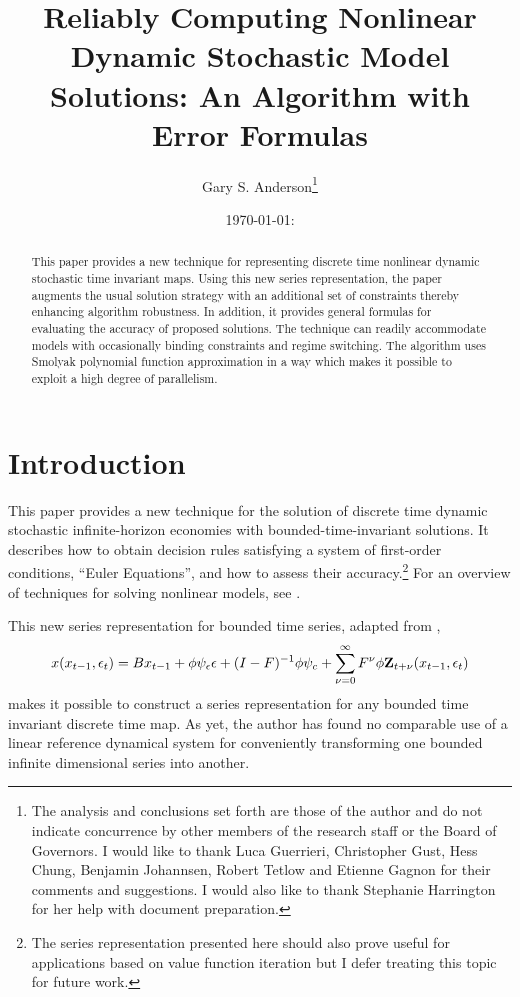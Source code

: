 \documentclass[12pt]{article}
\author{Gary S. Anderson\thanks{The analysis and conclusions set forth are those of the author and do not indicate concurrence by other members of the research staff or the Board of Governors. I would like to thank Luca Guerrieri, Christopher Gust, Hess Chung, Benjamin Johannsen, Robert Tetlow and Etienne Gagnon for their comments and suggestions.  I would also like to thank Stephanie Harrington for her help with document preparation.
}}
\title{Reliably Computing
  Nonlinear Dynamic Stochastic Model Solutions: 
An Algorithm with Error Formulas } %
\date{\today: \currenttime}
\begin{document}



\maketitle

\begin{abstract}
This paper provides a new technique for representing  discrete time  nonlinear dynamic stochastic time invariant maps.
Using this new series representation, the paper 
augments the usual solution strategy with an additional set of
constraints thereby enhancing algorithm robustness.
In addition, it provides general
formulas for evaluating the accuracy of proposed solutions.
The technique can readily accommodate models with occasionally binding constraints and regime switching. 
The  algorithm  uses
Smolyak polynomial function approximation  in a way which makes it possible to exploit a high degree of parallelism.







\end{abstract}

\newpage
\tableofcontents
\newpage

\section{Introduction}

This paper provides a new technique for
 the solution of discrete time  dynamic stochastic
infinite-horizon economies with bounded-time-invariant solutions.
It describes how to obtain decision rules satisfying a system of 
first-order conditions, ``Euler Equations'',  and how to assess their accuracy.\footnote{The series 
representation presented here should also prove useful for applications based on
value function iteration but I  defer treating this topic for
 future work.
}
 For an overview of techniques for solving nonlinear models,
see \citep{judd92,Christiano2000,doraszelskiy04,gaspar97,Judd2014,marcet.lorenzoni99,juddGSSA2011,maliarmovingbounds,RePEc:bny:wpaper:0058,JuddIntegrals}.


This new series representation for bounded time series, adapted from \citep{anderson10},
\begin{gather*}
      	 x\tArg =B x_{t-1}+ \phi \psi_\epsilon\epsilon + (I - F)^{-1} \phi \psi_c + \sum_{\sForSum=0}^\infty F^\sForSum \phi \ZWOarg_{t+\nu}\tArg%
    \end{gather*}
 makes it possible to  construct a series
    representation for any bounded time invariant discrete time map. As yet, the author has found no comparable use of a
linear reference dynamical system for  conveniently transforming
one bounded infinite dimensional series into another.
\end{document}
